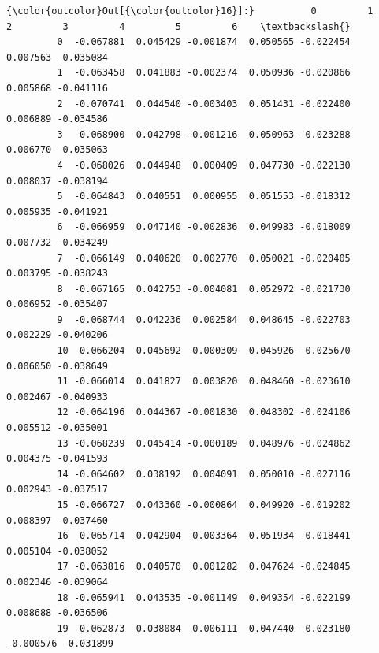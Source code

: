 \documentclass[11pt]{article}
\begin{document}
\begin{Verbatim}[commandchars=\\\{\}]
{\color{outcolor}Out[{\color{outcolor}16}]:}          0         1         2         3         4         5         6    \textbackslash{}
         0  -0.067881  0.045429 -0.001874  0.050565 -0.022454  0.007563 -0.035084   
         1  -0.063458  0.041883 -0.002374  0.050936 -0.020866  0.005868 -0.041116   
         2  -0.070741  0.044540 -0.003403  0.051431 -0.022400  0.006889 -0.034586   
         3  -0.068900  0.042798 -0.001216  0.050963 -0.023288  0.006770 -0.035063   
         4  -0.068026  0.044948  0.000409  0.047730 -0.022130  0.008037 -0.038194   
         5  -0.064843  0.040551  0.000955  0.051553 -0.018312  0.005935 -0.041921   
         6  -0.066959  0.047140 -0.002836  0.049983 -0.018009  0.007732 -0.034249   
         7  -0.066149  0.040620  0.002770  0.050021 -0.020405  0.003795 -0.038243   
         8  -0.067165  0.042753 -0.004081  0.052972 -0.021730  0.006952 -0.035407   
         9  -0.068744  0.042236  0.002584  0.048645 -0.022703  0.002229 -0.040206   
         10 -0.066204  0.045692  0.000309  0.045926 -0.025670  0.006050 -0.038649   
         11 -0.066014  0.041827  0.003820  0.048460 -0.023610  0.002467 -0.040933   
         12 -0.064196  0.044367 -0.001830  0.048302 -0.024106  0.005512 -0.035001   
         13 -0.068239  0.045414 -0.000189  0.048976 -0.024862  0.004375 -0.041593   
         14 -0.064602  0.038192  0.004091  0.050010 -0.027116  0.002943 -0.037517   
         15 -0.066727  0.043360 -0.000864  0.049920 -0.019202  0.008397 -0.037460   
         16 -0.065714  0.042904  0.003364  0.051934 -0.018441  0.005104 -0.038052   
         17 -0.063816  0.040570  0.001282  0.047624 -0.024845  0.002346 -0.039064   
         18 -0.065941  0.043535 -0.001149  0.049354 -0.022199  0.008688 -0.036506   
         19 -0.062873  0.038084  0.006111  0.047440 -0.023180 -0.000576 -0.031899   
         

\end{Verbatim}
\end{document}

